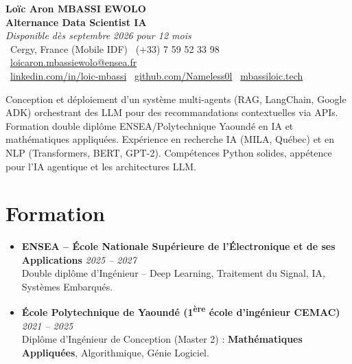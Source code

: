 \documentclass[a4paper,11pt]{article}
\begin{document}
\begin{center}
    {\Large \textbf{Loïc Aron MBASSI EWOLO}} \\ \vspace{4pt}
    \textbf{\large Alternance Data Scientist IA} \\
    \textit{\small Disponible dès septembre 2026 pour 12 mois} \\ \vspace{4pt}
    \small
    \faMapMarker\ Cergy, France (Mobile IDF) \quad
    \faPhone\ (+33) 7 59 52 33 98 \quad
    {\color{primary}\faEnvelope\ \href{mailto:loicaron.mbassiewolo@ensea.fr}{loicaron.mbassiewolo@ensea.fr}} \\ \vspace{2pt}
    {\color{primary}\faLinkedin\ \href{https://www.linkedin.com/in/loic-mbassi/}{linkedin.com/in/loic-mbassi}} \quad
    {\color{primary}\faGithub\ \href{https://github.com/Nameless0l}{github.com/Nameless0l}} \quad
    {\color{primary}\faGlobe\ \href{https://mbassiloic.tech}{mbassiloic.tech}}
\end{center}

\vspace{-6pt}

\noindent\small{Conception et déploiement d'un système multi-agents (RAG, LangChain, Google ADK) orchestrant des LLM pour des recommandations contextuelles via APIs. Formation double diplôme ENSEA/Polytechnique Yaoundé en IA et mathématiques appliquées. Expérience en recherche IA (MILA, Québec) et en NLP (Transformers, BERT, GPT-2). Compétences Python solides, appétence pour l'IA agentique et les architectures LLM.}

\section{Formation}
\begin{itemize}[leftmargin=*, label=\tiny$\bullet$, nosep]
    \item \textbf{ENSEA -- École Nationale Supérieure de l'Électronique et de ses Applications} \hfill \textit{2025 -- 2027} \\
    \small{Double diplôme d'Ingénieur -- Deep Learning, Traitement du Signal, IA, Systèmes Embarqués.}
    \item \textbf{École Polytechnique de Yaoundé (1\textsuperscript{ère} école d'ingénieur CEMAC)} \hfill \textit{2021 -- 2025} \\
    \small{Diplôme d'Ingénieur de Conception (Master 2) : \textbf{Mathématiques Appliquées}, Algorithmique, Génie Logiciel.}
\end{itemize}
\end{document}
